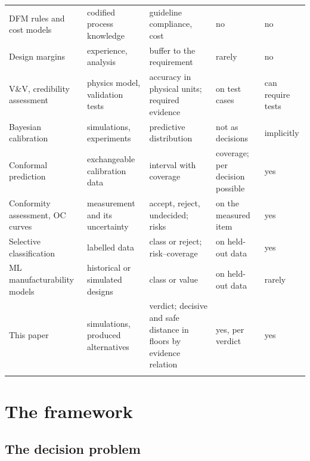 \documentclass[pdflatex,sn-basic,lineno]{sn-jnl} %
\providecommand{\DIFadd}[1]{{\protect\color{blue}\uwave{#1}}} %
\providecommand{\DIFaddbegin}{} %
\providecommand{\DIFaddend}{} %
\providecommand{\DIFaddendFL}{} %
\newcommand{\DIFaddincludegraphics}[2][]{{\color{blue}\fbox{\DIFOincludegraphics[#1]{#2}}}} %
\DeclareRobustCommand{\DIFaddbegin}{\DIFOaddbegin \let\includegraphics\DIFaddincludegraphics} %
\DeclareRobustCommand{\DIFaddend}{\DIFOaddend \let\includegraphics\DIFOincludegraphics} %
\DeclareRobustCommand{\DIFaddendFL}{\DIFOaddendFL \let\includegraphics\DIFOincludegraphics} %
\begin{document}
\begin{table}[t]
\begin{tabular}{@{}L{3.0cm}L{2.5cm}L{3.0cm}L{1.9cm}L{1.6cm}@{}}
\midrule
DFM rules and cost models \citep{boothroyd2010product} & codified process knowledge & guideline compliance, cost & no & no \\
Design margins \citep{eckert2019design} & experience, analysis & buffer to the requirement & rarely & no \\
V\&V, credibility assessment \citep{oberkampf2010verification, asme2018assessing} & physics model, validation tests & accuracy in physical units; required evidence & on test cases & can require tests \\
Bayesian calibration \citep{kennedy2001bayesian} & simulations, experiments & predictive distribution & not as decisions & implicitly \\
Conformal prediction \citep{lei2018distribution} & exchangeable calibration data & interval with coverage & coverage; per decision possible & yes \\
Conformity assessment, OC curves \citep{iso2017decision, bechhofer1954single} & measurement and its uncertainty & accept, reject, undecided; risks & on the measured item & yes \\
Selective classification \citep{chow1970optimum, geifman2017selective} & labelled data & class or reject; risk--coverage & on held-out data & yes \\
ML manufacturability models \citep{ghadai2018learning, yan2026machine} & historical or simulated designs & class or value & on held-out data & rarely \\
This paper & simulations, produced alternatives & verdict; decisive and safe distance in floors by evidence relation & yes, per verdict & yes \\
\botrule
\end{tabular}
\DIFaddendFL \end{table}

\section{The framework}\label{sec:method}

\subsection{The decision problem \DIFaddbegin \DIFadd{and its scope}\DIFaddend }\label{sec:problem}
\end{document}
